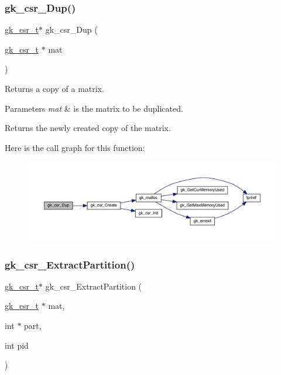 \subsubsection{\texorpdfstring{gk\+\_\+csr\+\_\+\+Dup()}{gk\_csr\_Dup()}}
{\footnotesize\ttfamily \hyperlink{a00634}{gk\+\_\+csr\+\_\+t}$\ast$ gk\+\_\+csr\+\_\+\+Dup (\begin{DoxyParamCaption}\item[{\hyperlink{a00634}{gk\+\_\+csr\+\_\+t} $\ast$}]{mat }\end{DoxyParamCaption})}

Returns a copy of a matrix. 
\begin{DoxyParams}{Parameters}
{\em mat} & is the matrix to be duplicated. \\
\hline
\end{DoxyParams}
\begin{DoxyReturn}{Returns}
the newly created copy of the matrix. 
\end{DoxyReturn}
Here is the call graph for this function\+:\nopagebreak
\begin{figure}[H]
\begin{center}
\leavevmode
\includegraphics[width=350pt]{a00077_a24144cf4c30d5ec4ed8b488d371476b3_cgraph}
\end{center}
\end{figure}
\mbox{\label{a00077_ac59047c4a89fa4680d746fcdce4aa1a7}} 
\subsubsection{\texorpdfstring{gk\+\_\+csr\+\_\+\+Extract\+Partition()}{gk\_csr\_ExtractPartition()}}
{\footnotesize\ttfamily \hyperlink{a00634}{gk\+\_\+csr\+\_\+t}$\ast$ gk\+\_\+csr\+\_\+\+Extract\+Partition (\begin{DoxyParamCaption}\item[{\hyperlink{a00634}{gk\+\_\+csr\+\_\+t} $\ast$}]{mat,  }\item[{int $\ast$}]{part,  }\item[{int}]{pid }\end{DoxyParamCaption})}

